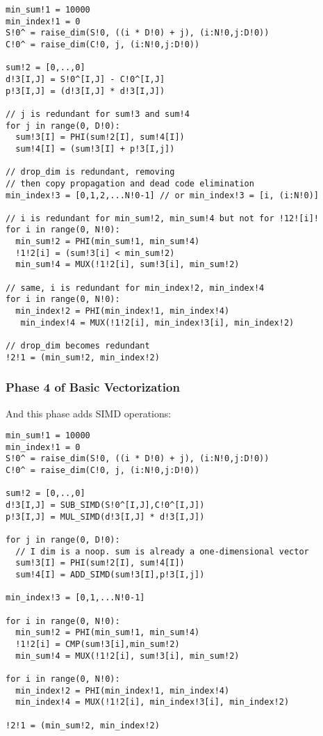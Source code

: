 {\small
\begin{verbatim}
min_sum!1 = 10000
min_index!1 = 0
S!0^ = raise_dim(S!0, ((i * D!0) + j), (i:N!0,j:D!0))
C!0^ = raise_dim(C!0, j, (i:N!0,j:D!0))

sum!2 = [0,..,0]
d!3[I,J] = S!0^[I,J] - C!0^[I,J]
p!3[I,J] = (d!3[I,J] * d!3[I,J])

// j is redundant for sum!3 and sum!4
for j in range(0, D!0):
  sum!3[I] = PHI(sum!2[I], sum!4[I])       
  sum!4[I] = (sum!3[I] + p!3[I,j])

// drop_dim is redundant, removing
// then copy propagation and dead code elimination 
min_index!3 = [0,1,2,...N!0-1] // or min_index!3 = [i, (i:N!0)]

// i is redundant for min_sum!2, min_sum!4 but not for !12![i]!
for i in range(0, N!0):
  min_sum!2 = PHI(min_sum!1, min_sum!4) 
  !1!2[i] = (sum!3[i] < min_sum!2)
  min_sum!4 = MUX(!1!2[i], sum!3[i], min_sum!2)

// same, i is redundant for min_index!2, min_index!4
for i in range(0, N!0):
  min_index!2 = PHI(min_index!1, min_index!4)  
   min_index!4 = MUX(!1!2[i], min_index!3[i], min_index!2)

// drop_dim becomes redundant
!2!1 = (min_sum!2, min_index!2)
\end{verbatim}
}

\subsubsection{Phase 4 of Basic Vectorization}

And this phase adds SIMD operations:

{\small
\begin{verbatim}
min_sum!1 = 10000
min_index!1 = 0
S!0^ = raise_dim(S!0, ((i * D!0) + j), (i:N!0,j:D!0))
C!0^ = raise_dim(C!0, j, (i:N!0,j:D!0))

sum!2 = [0,..,0]
d!3[I,J] = SUB_SIMD(S!0^[I,J],C!0^[I,J])
p!3[I,J] = MUL_SIMD(d!3[I,J] * d!3[I,J])

for j in range(0, D!0):
  // I dim is a noop. sum is already a one-dimensional vector
  sum!3[I] = PHI(sum!2[I], sum!4[I])       
  sum!4[I] = ADD_SIMD(sum!3[I],p!3[I,j])

min_index!3 = [0,1,...N!0-1]   

for i in range(0, N!0):
  min_sum!2 = PHI(min_sum!1, min_sum!4) 
  !1!2[i] = CMP(sum!3[i],min_sum!2)
  min_sum!4 = MUX(!1!2[i], sum!3[i], min_sum!2)
    
for i in range(0, N!0):
  min_index!2 = PHI(min_index!1, min_index!4)  
  min_index!4 = MUX(!1!2[i], min_index!3[i], min_index!2)
   
!2!1 = (min_sum!2, min_index!2)   
\end{verbatim}
}


